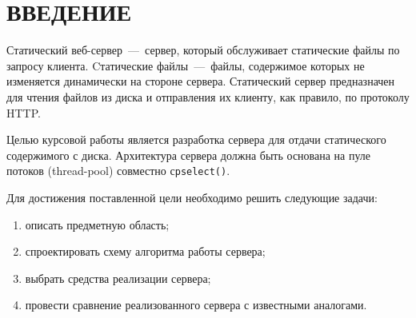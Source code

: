 \chapter*{ВВЕДЕНИЕ}

Статический веб-сервер~---~сервер, который обслуживает статические файлы по запросу клиента.
Cтатические файлы~---~файлы, содержимое которых не изменяется динамически на стороне сервера.
Статический сервер предназначен для чтения файлов из диска и отправления их клиенту, как правило, по протоколу HTTP.

Целью курсовой работы является разработка сервера для отдачи статического содержимого с диска.
Архитектура сервера должна быть основана на пуле потоков (thread-pool) совместно с\texttt{pselect()}.

Для достижения поставленной цели необходимо решить следующие задачи:
\begin{enumerate}
	\item описать предметную область;
	\item спроектировать схему алгоритма работы сервера;
	\item выбрать средства реализации сервера;
	\item провести сравнение реализованного сервера с известными аналогами.
\end{enumerate} 
